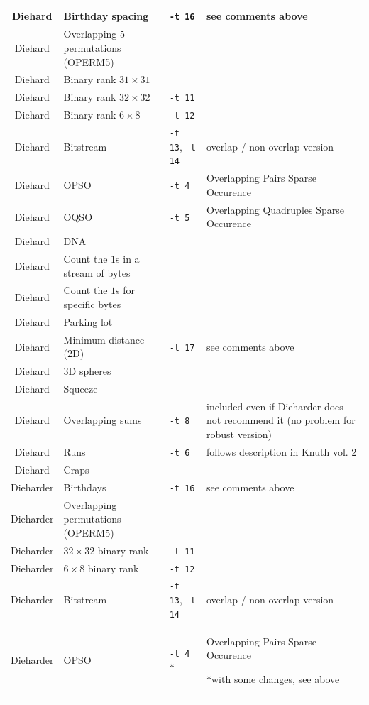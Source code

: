 \documentclass[12pt,a4paper,fullpage]{article}
\begin{document}
\begin{longtable}{|c|>{\raggedright\arraybackslash}p{3cm}|l|>{\raggedright\arraybackslash}p{4cm}|}
Diehard & Birthday spacing & \texttt{-t 16}& see comments above \\ \hline
Diehard & Overlapping 5-per\-mu\-tat\-ions (OPERM5)& &\\ \hline
Diehard & Binary rank $31\times 31$ & &\\ \hline
Diehard & Binary rank $32\times 32$&  \texttt{-t 11}&\\ \hline
Diehard & Binary rank $6\times 8$& \texttt{-t 12}  &\\ \hline
Diehard & Bitstream & \texttt{-t 13}, \texttt{-t 14}& overlap / non-overlap version\\ \hline
Diehard & OPSO & \texttt{-t 4} & Overlapping Pairs Sparse Occurence \\ \hline
Diehard & OQSO & \texttt{-t 5} & Overlapping Quadruples Sparse Occurence\\ \hline
Diehard & DNA & &  \\ \hline
Diehard & Count the $1$s  in a stream of bytes& & \\ \hline
Diehard & Count the $1$s for specific bytes & & \\ \hline
Diehard & Parking lot & & \\ \hline
Diehard & Minimum distance (2D) & \texttt{-t 17} & see comments above \\\hline
Diehard & 3D spheres & & \\ \hline
Diehard & Squeeze & &  \\ \hline
Diehard & Overlapping sums & \texttt{-t 8} & included even if Dieharder does not recommend it (no problem for robust version)\\ \hline
Diehard & Runs & \texttt{-t 6}& follows description in Knuth vol. 2\\ \hline
Diehard & Craps & & \\ \hline
\hline
Dieharder & Birthdays & \texttt{-t 16}& see comments above\\ \hline %
Dieharder & Overlapping permutations (OPERM5)& &  \\ \hline %
Dieharder & $32\times32$ binary rank& \texttt{-t 11} & \\ \hline %
Dieharder & $6\times 8$ binary rank&  \texttt{-t 12}&\\ \hline %
Dieharder & Bitstream & \texttt{-t 13}, \texttt{-t 14} &overlap / non-overlap version\\ \hline %
Dieharder & OPSO &  \texttt{-t 4} $*$ & Overlapping Pairs Sparse Occurence \par $*$with some changes, see above\\\hline %

\end{longtable}
\end{document}
